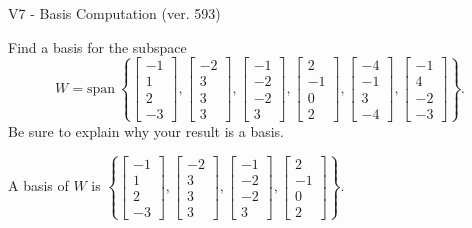 \begin{exercise}
  \begin{exerciseTitle}V7 - Basis Computation (ver. 593)\end{exerciseTitle}
  \begin{exerciseStatement}
    Find a basis for the subspace 
\[W=\mathrm{span}\ \left\{\left[\begin{array}{r}
-1 \\
1 \\
2 \\
-3
\end{array}\right] , \left[\begin{array}{r}
-2 \\
3 \\
3 \\
3
\end{array}\right] , \left[\begin{array}{r}
-1 \\
-2 \\
-2 \\
3
\end{array}\right] , \left[\begin{array}{r}
2 \\
-1 \\
0 \\
2
\end{array}\right] , \left[\begin{array}{r}
-4 \\
-1 \\
3 \\
-4
\end{array}\right] , \left[\begin{array}{r}
-1 \\
4 \\
-2 \\
-3
\end{array}\right]\right\}.\]
 Be sure to explain why your result is a basis.


  \end{exerciseStatement}
  \begin{exerciseAnswer}
   A basis of \(W\) is  \(\left\{\left[\begin{array}{r}
-1 \\
1 \\
2 \\
-3
\end{array}\right] , \left[\begin{array}{r}
-2 \\
3 \\
3 \\
3
\end{array}\right] , \left[\begin{array}{r}
-1 \\
-2 \\
-2 \\
3
\end{array}\right] , \left[\begin{array}{r}
2 \\
-1 \\
0 \\
2
\end{array}\right]\right\}\).
  


  \end{exerciseAnswer}
\end{exercise}